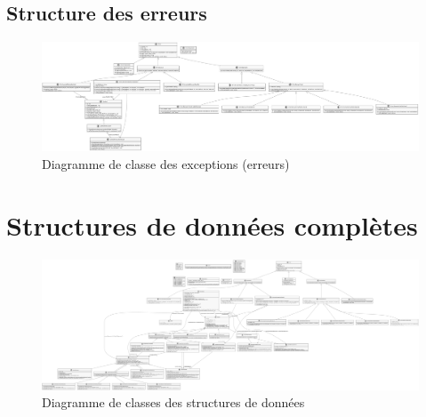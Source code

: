 {	\subsection{Structure des erreurs}
	\label{subsec:erreur-structure}
	
	\begin{figure}[H]
		\centerline{
			\includegraphics[width=1.0\textwidth,keepaspectratio]{../diagrams-simplified/class/exceptions/lutin-compiler-class-diagram-exceptions-uml.png}
		}	
		\caption{Diagramme de classe des exceptions (erreurs)}
		\label{fig:erreur-structure}
	\end{figure}		
	
	\section{Structures de données complètes}
	\label{sec:full-structure}
	
	\begin{figure}[H]
		\centerline{
			\includegraphics[width=1.15\textwidth,keepaspectratio]{../diagrams/class/lutin-compiler-class-diagram-uml.png}
		}	
		\label{fig:full-structure}
		\caption{Diagramme de classes des structures de données}
	\end{figure}

	\clearpage
	\recalctypearea
}


